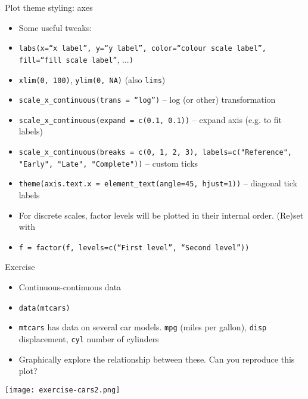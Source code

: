 \documentclass[10pt]{beamer}
\begin{document}
\begin{frame}{Plot theme styling: axes}
    \begin{itemize}
    \item Some useful tweaks:
    \item \texttt{labs(x=``x label'', y=``y label'', color=``colour scale label'', fill=``fill scale label''}, ...\texttt{)}
    \item \texttt{xlim(0, 100)}, \texttt{ylim(0, NA)} (also \texttt{lims})
    \item \texttt{scale\_x\_continuous(trans = ``log'')} -- log (or other) transformation
    \item \texttt{scale\_x\_continuous(expand = c(0.1, 0.1))} -- expand axis (e.g. to fit labels)
           \item \texttt{scale\_x\_continuous(breaks = c(0, 1, 2, 3), labels=c("Reference", "Early", "Late", "Complete"))} -- custom ticks
           \item \texttt{theme(axis.text.x = element\_text(angle=45, hjust=1))} -- diagonal tick labels
           \item For discrete scales, factor levels will be plotted in their internal order. (Re)set with
             \item[] \texttt{f = factor(f, levels=c(``First level'', ``Second level''))}
      \end{itemize}
\end{frame}

\begin{frame}{Exercise}
  \begin{itemize}
  \item Continuous-continuous data
    \item[] \texttt{data(mtcars)}
    \item \texttt{mtcars} has data on several car models. \texttt{mpg} (miles per gallon), \texttt{disp} displacement, \texttt{cyl} number of cylinders
     \item Graphically explore the relationship between these. Can you reproduce this plot?
  \end{itemize}
  \texttt{[image: exercise-cars2.png]}
\end{frame}
\end{document}

